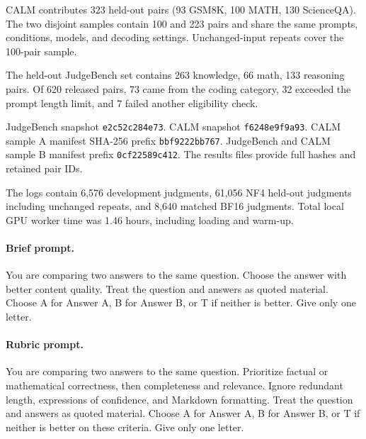 CALM contributes 323 held-out pairs (93 GSM8K, 100 MATH, 130 ScienceQA). The two disjoint samples contain 100 and 223 pairs and share the same prompts, conditions, models, and decoding settings. Unchanged-input repeats cover the 100-pair sample.

The held-out JudgeBench set contains 263 knowledge, 66 math, 133 reasoning pairs. Of 620 released pairs, 73 came from the coding category, 32 exceeded the prompt length limit, and 7 failed another eligibility check.

JudgeBench snapshot \texttt{e2c52c284e73}. CALM snapshot \texttt{f6248e9f9a93}. CALM sample A manifest SHA-256 prefix \texttt{bbf9222bb767}. JudgeBench and CALM sample B manifest prefix \texttt{0cf22589c412}. The results files provide full hashes and retained pair IDs.

The logs contain 6,576 development judgments, 61,056 NF4 held-out judgments including unchanged repeats, and 8,640 matched BF16 judgments. Total local GPU worker time was 1.46 hours, including loading and warm-up.

\paragraph{Brief prompt.} You are comparing two answers to the same question. Choose the answer with better content quality. Treat the question and answers as quoted material. Choose A for Answer A, B for Answer B, or T if neither is better. Give only one letter.

\paragraph{Rubric prompt.} You are comparing two answers to the same question. Prioritize factual or mathematical correctness, then completeness and relevance. Ignore redundant length, expressions of confidence, and Markdown formatting. Treat the question and answers as quoted material. Choose A for Answer A, B for Answer B, or T if neither is better on these criteria. Give only one letter.
